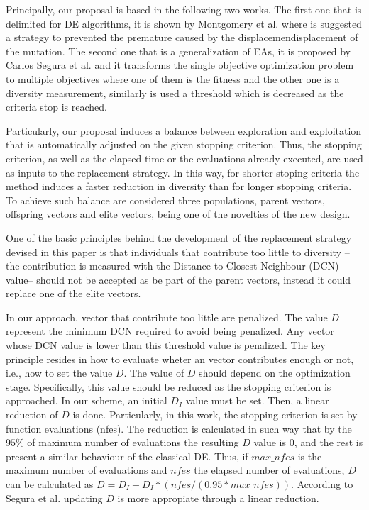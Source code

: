 Principally, our proposal is  based in the following two works.
%
The first one that is delimited for DE algorithms, it is shown by Montgomery et al. \cite{montgomery2012simple} where is suggested a strategy to prevented the premature caused by the displacemendisplacement of the mutation.
%
The second one that is a generalization of EAs, it is proposed by Carlos Segura et al. \cite{segura2016novel} and it transforms the single objective optimization problem to multiple objectives where one of them is the fitness and the other one is a diversity measurement, similarly is used a threshold which is decreased as the criteria stop is reached.
%

Particularly, our proposal induces a balance between exploration and exploitation that is automatically adjusted on the given stopping criterion.
%
Thus, the stopping criterion, as well as the elapsed time or the evaluations already executed, are used as inputs to the replacement strategy.
%
In this way, for shorter stoping criteria the method induces a faster reduction in diversity than for longer stopping criteria.
%
To achieve such balance are considered three populations, parent vectors, offspring vectors and elite vectors, being one of the novelties of the new design.
%

One of the basic principles behind the development of the replacement strategy devised in this paper is that individuals that contribute too little to diversity --the contribution is measured with the Distance to Closest Neighbour (DCN) value-- should not be accepted as be part of the parent vectors, instead it could replace one of the elite vectors.
%

In our approach, vector that contribute too little are penalized.
%
The value $D$ represent the minimum DCN required to avoid being penalized.
%
Any vector whose DCN value is lower than this threshold value is penalized.
%
The key principle resides in how to evaluate wheter an vector contributes enough or not, i.e., how to set the value $D$.
%
The value of $D$ should depend on the optimization stage.
%
Specifically, this value should be reduced as the stopping criterion is approached.
%
In our scheme, an initial $D_I$ value must be set.
%
Then, a linear reduction of $D$ is done.
%
Particularly, in this work, the stopping criterion is set by function evaluations (nfes).
%
The reduction is calculated in such way that by the $95\%$ of maximum number of evaluations the resulting $D$ value is $0$, and the rest is present a similar behaviour of the classical DE.
%
Thus, if $max\_nfes$ is the maximum number of evaluations and $nfes$ the elapsed number of evaluations, $D$ can be calculated as $D=D_I - D_I *(nfes/(0.95*max\_nfes))$.
%
According to Segura et al. \cite{segura2016novel} updating $D$ is more appropiate through a linear reduction.
%


